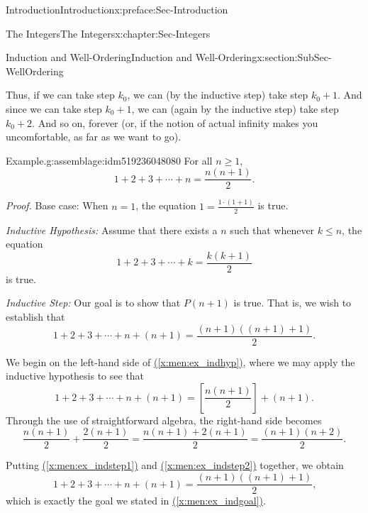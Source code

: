 \documentclass[oneside,10pt,]{book}
\newcommand{\xreffont}{\relax}
\numberwithin{equation}{section}
\renewcommand{\le}{\leqslant}
\renewcommand{\ge}{\geqslant}
\begin{document}
\begin{preface}{Introduction}{}{Introduction}{}{}{x:preface:Sec-Introduction}
\begin{chapterptx}{The Integers}{}{The Integers}{}{}{x:chapter:Sec-Integers}
\begin{sectionptx}{Induction and Well-Ordering}{}{Induction and Well-Ordering}{}{}{x:section:SubSec-WellOrdering}
\par
Thus, if we can take step \(k_0\), we can (by the inductive step) take step \(k_0 + 1\). And since we can take step \(k_0 + 1\), we can (again by the inductive step) take step \(k_0 + 2\). And so on, forever (or, if the notion of actual infinity makes you uncomfortable, as far as we want to go).%
\begin{assemblage}{Example.}{g:assemblage:idm519236048080}%
For all \(n \ge 1\),%
\begin{equation*}
1+ 2 + 3 + \cdots + n = \frac{n(n+1)}{2}\text{.}
\end{equation*}
%
\par
\emph{Proof.} Base case: When \(n = 1\), the equation \(1 = \frac{1\cdot (1+1)}{2}\) is true.%
\par
\emph{Inductive Hypothesis:} Assume that there exists a \(n\) such that whenever \(k \le n\), the equation%
\begin{equation}
1+ 2 + 3 + \cdots + k = \frac{k(k+1)}{2}\label{x:men:ex_indhyp}
\end{equation}
is true.%
\par
\emph{Inductive Step:} Our goal is to show that \(P(n+1)\) is true. That is, we wish to establish that%
\begin{equation}
1+ 2 + 3 + \cdots + n + (n+1) = \frac{(n+1)((n+1)+1)}{2}\text{.}\label{x:men:ex_indgoal}
\end{equation}
%
\par
We begin on the left-hand side of \hyperref[x:men:ex_indhyp]{({\xreffont\ref{x:men:ex_indhyp}})}, where we may apply the inductive hypothesis to see that%
\begin{equation}
1+ 2 + 3 + \cdots + n + (n+1) = \left[\frac{n(n+1)}{2}\right] + (n+1)\text{.}\label{x:men:ex_indstep1}
\end{equation}
Through the use of straightforward algebra, the right-hand side becomes%
\begin{equation}
\frac{n(n+1)}{2} + \frac{2(n+1)}{2} = \frac{n(n+1) + 2(n+1)}{2} = \frac{(n+1)(n+2)}{2}\text{.}\label{x:men:ex_indstep2}
\end{equation}
%
\par
Putting \hyperref[x:men:ex_indstep1]{({\xreffont\ref{x:men:ex_indstep1}})} and \hyperref[x:men:ex_indstep2]{({\xreffont\ref{x:men:ex_indstep2}})} together, we obtain%
\begin{equation*}
1+ 2 + 3 + \cdots + n + (n+1) = \frac{(n+1)((n+1)+1)}{2}\text{,}
\end{equation*}
which is exactly the goal we stated in \hyperref[x:men:ex_indgoal]{({\xreffont\ref{x:men:ex_indgoal}})}.%

\end{assemblage}
\end{sectionptx}
\end{chapterptx}
\end{preface}
\end{document}
